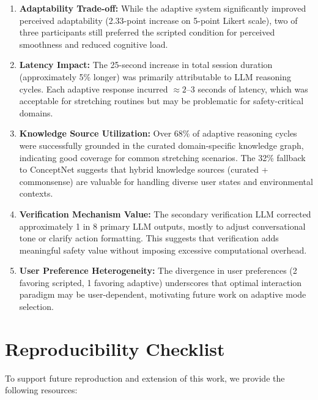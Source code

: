 \begin{enumerate}
\item \textbf{Adaptability Trade-off:} While the adaptive system significantly improved perceived adaptability (2.33-point increase on 5-point Likert scale), two of three participants still preferred the scripted condition for perceived smoothness and reduced cognitive load.

\item \textbf{Latency Impact:} The 25-second increase in total session duration (approximately 5\% longer) was primarily attributable to LLM reasoning cycles. Each adaptive response incurred $\approx2$--3 seconds of latency, which was acceptable for stretching routines but may be problematic for safety-critical domains.

\item \textbf{Knowledge Source Utilization:} Over 68\% of adaptive reasoning cycles were successfully grounded in the curated domain-specific knowledge graph, indicating good coverage for common stretching scenarios. The 32\% fallback to ConceptNet suggests that hybrid knowledge sources (curated + commonsense) are valuable for handling diverse user states and environmental contexts.

\item \textbf{Verification Mechanism Value:} The secondary verification LLM corrected approximately 1 in 8 primary LLM outputs, mostly to adjust conversational tone or clarify action formatting. This suggests that verification adds meaningful safety value without imposing excessive computational overhead.

\item \textbf{User Preference Heterogeneity:} The divergence in user preferences (2 favoring scripted, 1 favoring adaptive) underscores that optimal interaction paradigm may be user-dependent, motivating future work on adaptive mode selection.
\end{enumerate}

\section{Reproducibility Checklist}
\label{appendix:reproducibility}

To support future reproduction and extension of this work, we provide the following resources:

